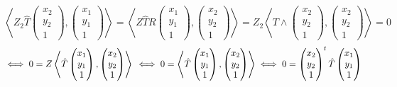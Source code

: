 \documentclass[a4paper,12pt]{article}
\begin{document}
	\begin{displaymath}
		\left\langle Z_2\hat{T}\begin{pmatrix}
			x_2\\y_2\\1
		\end{pmatrix}, \begin{pmatrix}
			x_1\\y_1\\1
		\end{pmatrix}
		\right\rangle
		=
		\left\langle Z\hat{T}R\begin{pmatrix}
			x_1\\y_1\\1
		\end{pmatrix}, \begin{pmatrix}
			x_2\\y_2\\1
		\end{pmatrix}
		\right\rangle = Z_2\left\langle T\wedge\begin{pmatrix}
			x_2\\y_2\\1
		\end{pmatrix}, \begin{pmatrix}
			x_2\\y_2\\1
		\end{pmatrix}\right\rangle = 0
	\end{displaymath}
	\begin{displaymath}
		\iff 0 = Z\left\langle \hat{T}\begin{pmatrix}
			x_1\\y_1\\1
		\end{pmatrix},
		\begin{pmatrix}
			x_2\\y_2\\1
		\end{pmatrix}
		\right\rangle\\
		\iff 0 = \left\langle \hat{T}\begin{pmatrix}
			x_1\\y_1\\1
		\end{pmatrix},
		\begin{pmatrix}
			x_2\\y_2\\1
		\end{pmatrix}
		\right\rangle
		\iff 0 = \begin{pmatrix}
			x_2\\y_2\\1
		\end{pmatrix}^t \hat{T}\begin{pmatrix}
			x_1\\y_1\\1
		\end{pmatrix}
	\end{displaymath}
\end{document}

